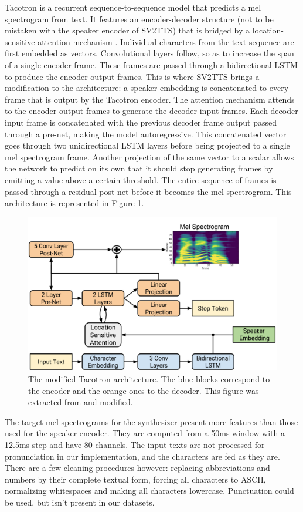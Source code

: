 \documentclass[a4paper, oneside, 12pt, english]{article}
\begin{document}
Tacotron is a recurrent sequence-to-sequence model that predicts a mel spectrogram from text. It features an encoder-decoder structure (not to be mistaken with the speaker encoder of SV2TTS) that is bridged by a location-sensitive attention mechanism \citep{Attention2}. Individual characters from the text sequence are first embedded as vectors. Convolutional layers follow, so as to increase the span of a single encoder frame. These frames are passed through a bidirectional LSTM to produce the encoder output frames. This is where SV2TTS brings a modification to the architecture: a speaker embedding is concatenated to every frame that is output by the Tacotron encoder. The attention mechanism attends to the encoder output frames to generate the decoder input frames. Each decoder input frame is concatenated with the previous decoder frame output passed through a pre-net, making the model autoregressive. This concatenated vector goes through two unidirectional LSTM layers before being projected to a single mel spectrogram frame. Another projection of the same vector to a scalar allows the network to predict on its own that it should stop generating frames by emitting a value above a certain threshold. The entire sequence of frames is passed through a residual post-net before it becomes the mel spectrogram. This architecture is represented in Figure \ref{tacotron2_arch}.

\begin{figure}[h]
	\centering
	\includegraphics[width=0.7\linewidth]{images/tacotron2_arch.png}
	\caption{The modified Tacotron architecture. The blue blocks correspond to the encoder and the orange ones to the decoder. This figure was extracted from \citep{Tacotron2} and modified.}
	\label{tacotron2_arch}
\end{figure}

The target mel spectrograms for the synthesizer present more features than those used for the speaker encoder. They are computed from a 50ms window with a 12.5ms step and have 80 channels. The input texts are not processed for pronunciation in our implementation, and the characters are fed as they are. There are a few cleaning procedures however: replacing abbreviations and numbers by their complete textual form, forcing all characters to ASCII, normalizing whitespaces and making all characters lowercase. Punctuation could be used, but isn't present in our datasets.
\end{document}
